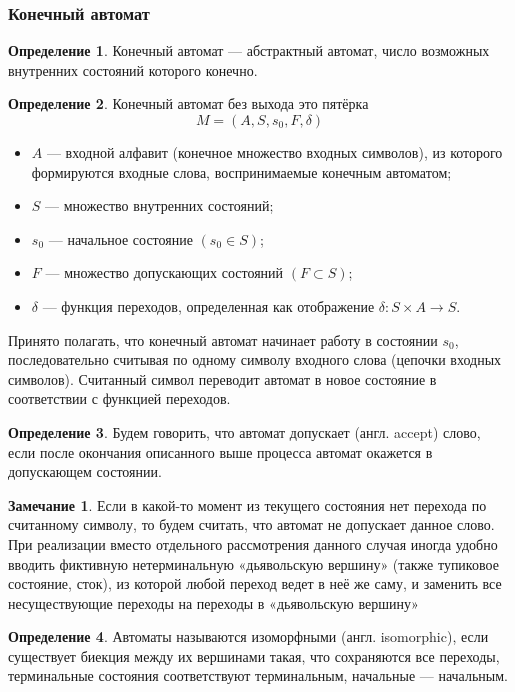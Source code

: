 \documentclass[10pt,twoside]{article}
\theoremstyle{plain}
\theoremstyle{definition}
\newtheorem{defi}{Определение}
\newtheorem*{remark}{Замечание}
\begin{document}
\subsubsection{Конечный автомат}
\begin{defi}
Конечный автомат — абстрактный автомат, число возможных внутренних состояний которого конечно.
\end{defi}

\begin{defi} Конечный автомат без выхода это пятёрка
$$\displaystyle M=(A,S,s_{0},F,\delta )$$
\begin{itemize}
\item $A$ — входной алфавит (конечное множество входных символов), из которого формируются входные слова, воспринимаемые конечным автоматом;
\item $S$ — множество внутренних состояний;
\item $s_{0}$ — начальное состояние $(s_{0}\in S)$;
\item $F$ — множество допускающих состояний $(F\subset S)$;
\item $\delta$  — функция переходов, определенная как отображение $\displaystyle \delta \colon S\times A\rightarrow S$.
\end{itemize}
Принято полагать, что конечный автомат начинает работу в состоянии $s_{0}$, последовательно считывая по одному символу входного слова (цепочки входных символов). Считанный символ переводит автомат в новое состояние в соответствии с функцией переходов.
\end{defi}

\begin{defi}
Будем говорить, что автомат допускает (англ. accept) слово, если после окончания описанного выше процесса автомат окажется в допускающем состоянии.
\end{defi}

\begin{remark}
Если в какой-то момент из текущего состояния нет перехода по считанному символу, то будем считать, что автомат не допускает данное слово. При реализации вместо отдельного рассмотрения данного случая иногда удобно вводить фиктивную нетерминальную «дьявольскую вершину» (также тупиковое состояние, сток), из которой любой переход ведет в неё же саму, и заменить все несуществующие переходы на переходы в «дьявольскую вершину»
\end{remark}

\begin{defi}
Автоматы называются изоморфными (англ. isomorphic), если существует биекция между их вершинами такая, что сохраняются все переходы, терминальные состояния соответствуют терминальным, начальные — начальным.
\end{defi}
\end{document}
